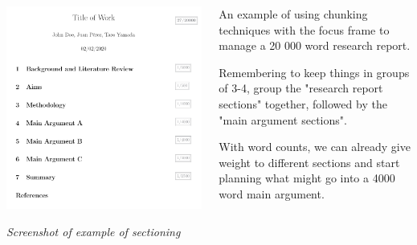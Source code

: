 \documentclass[unknownkeysallowed,usepdftitle=false, parskip=full]{beamer}
\newcommand{\secvariable}{nothing}
\newcommand{\mysection}[1]{\renewcommand{\secvariable}{#1}
}
\begin{document}
\mysection{major}
\begin{frame}\label{\secvariable} %
    \begin{columns}[t]
    \begin{column}[c]{0.6\textwidth}
              \includegraphics[scale=0.5]{figure/sectioning}
    
    \tiny{\textit{Screenshot of example of sectioning}} 
    \end{column}
    \begin{column}[c]{0.45\textwidth}
    \parbox{\linewidth}{

    \small An example of using chunking techniques with the focus frame to manage a 20 000 word research report.
    
    \vspace{12pt}
    
    Remembering to keep things in groups of 3-4, group the "research report sections" together, followed by the "main argument sections".
    
    \vspace{12pt}
    
    With word counts, we can already give weight to different sections and start planning what might go into a 4000 word main argument.      }
    \end{column}
    
  \end{columns}

    \parbox{\linewidth}{

}
\end{frame}
\end{document}
